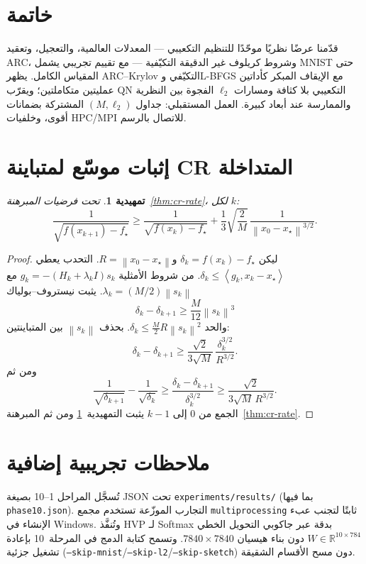 \documentclass[11pt,a4paper]{article}
\theoremstyle{plain}
\newtheorem{lemma}[theorem]{تمهيدية}
\theoremstyle{definition}
\newcommand{\R}{\mathbb{R}}
\newcommand{\norm}[1]{\left\|#1\right\|}
\newcommand{\inner}[2]{\left\langle #1,#2\right\rangle}
\begin{document}
\section{خاتمة}
قدّمنا عرضًا نظريًا موحّدًا للتنظيم التكعيبي --- المعدلات العالمية، والتعجيل، وتعقيد ARC، وشروط كريلوف غير الدقيقة التكيّفية --- مع تقييم تجريبي يشمل MNIST حتى المقياس الكامل.
يظهر ARC--Krylov التكيّفي وL-BFGS مع الإيقاف المبكر كأداتين عمليتين متكاملتين؛ ويقرّب QN التكعيبي بلا كثافة ومسارات $\ell_{2}$ الفجوة بين النظرية والممارسة عند أبعاد كبيرة.
العمل المستقبلي: جداول $(M,\ell_{2})$ المشتركة بضمانات أقوى، وخلفيات HPC/MPI للاتصال بالرسم.

\appendix
\section{إثبات موسّع لمتباينة CR المتداخلة}
\label{app:cr-proof}

\begin{lemma}
\label{lem:np-aux}
تحت فرضيات المبرهنة~\ref{thm:cr-rate}، لكل $k$:
\begin{equation}
\frac{1}{\sqrt{f(x_{k+1})-f_{\star}}}
\ge
\frac{1}{\sqrt{f(x_{k})-f_{\star}}}
+
\frac{1}{3}\sqrt{\frac{2}{M}}\,\frac{1}{\norm{x_{0}-x_{\star}}^{3/2}}.
\end{equation}
\end{lemma}

\begin{proof}
ليكن $\delta_{k}=f(x_{k})-f_{\star}$ و$R=\norm{x_{0}-x_{\star}}$.
التحدب يعطي $\delta_{k}\le\inner{g_{k}}{x_{k}-x_{\star}}$.
من شروط الأمثلية $g_{k}=-(H_{k}+\lambda_{k}I)s_{k}$ مع $\lambda_{k}=(M/2)\norm{s_{k}}$.
يثبت نيستروف--بولياك
\begin{equation}
\delta_{k}-\delta_{k+1}
\ge
\frac{M}{12}\norm{s_{k}}^{3}
\end{equation}
والحد $\delta_{k}\le \tfrac{M}{2}R\norm{s_{k}}^{2}$.
بحذف $\norm{s_{k}}$ بين المتباينتين:
\[
\delta_{k}-\delta_{k+1}
\ge
\frac{\sqrt{2}}{3\sqrt{M}}\,\frac{\delta_{k}^{3/2}}{R^{3/2}}.
\]
ومن ثم
\[
\frac{1}{\sqrt{\delta_{k+1}}}
-
\frac{1}{\sqrt{\delta_{k}}}
\ge
\frac{\delta_{k}-\delta_{k+1}}{\delta_{k}^{3/2}}
\ge
\frac{\sqrt{2}}{3\sqrt{M}\,R^{3/2}}.
\]
الجمع من $0$ إلى $k-1$ يثبت التمهيدية~\ref{lem:np-aux} ومن ثم المبرهنة~\ref{thm:cr-rate}.
\end{proof}

\section{ملاحظات تجريبية إضافية}
\label{app:exp}
تُسجَّل المراحل 1--10 بصيغة JSON تحت \textenglish{\texttt{experiments/results/}} (بما فيها \textenglish{\texttt{phase10.json}}).
التجارب الموزّعة تستخدم مجمع \textenglish{\texttt{multiprocessing}} ثابتًا لتجنب عبء الإنشاء في Windows.
وتُنفَّذ HVP لـ Softmax بدقة عبر جاكوبي التحويل الخطي $W\in\R^{10\times 784}$ دون بناء هيسيان $7840\times 7840$.
وتسمح كتابة الدمج في المرحلة~10 بإعادة تشغيل جزئية (\textenglish{\texttt{--skip-mnist}}/\textenglish{\texttt{--skip-l2}}/\textenglish{\texttt{--skip-sketch}}) دون مسح الأقسام الشقيقة.
\end{document}
